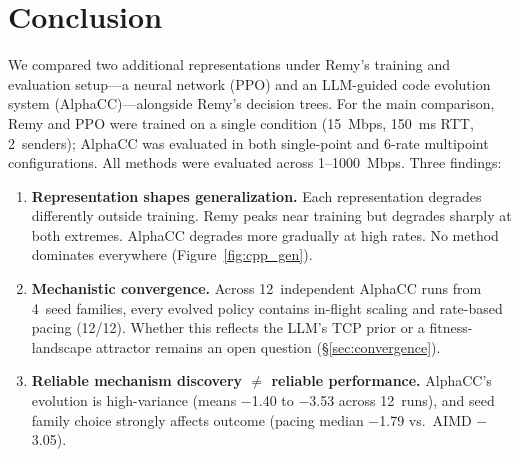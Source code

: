 \section{Conclusion}

We compared two additional representations under Remy's training and
evaluation setup---a neural network (PPO) and an LLM-guided code
evolution system (AlphaCC)---alongside Remy's decision trees. For the
main comparison, Remy and PPO were trained on a single condition
(15~Mbps, 150~ms RTT, 2~senders); AlphaCC was evaluated in both
single-point and 6-rate multipoint configurations. All methods
were evaluated across 1--1000~Mbps. Three findings:

\begin{enumerate}
\item \textbf{Representation shapes generalization.} Each
  representation degrades differently outside training. Remy peaks
  near training but degrades sharply at both extremes. AlphaCC
  degrades more gradually at high rates. No method dominates
  everywhere (Figure~\ref{fig:cpp_gen}).

\item \textbf{Mechanistic convergence.} Across 12~independent
  AlphaCC runs from 4~seed families, every evolved policy contains
  in-flight scaling and rate-based pacing (12/12).
  Whether this reflects the LLM's TCP prior or a fitness-landscape
  attractor remains an open question (\S\ref{sec:convergence}).

\item \textbf{Reliable mechanism discovery $\neq$ reliable
  performance.} AlphaCC's evolution is high-variance (means
  $-$1.40 to $-$3.53 across 12~runs), and seed family choice
  strongly affects outcome (pacing median $-$1.79 vs.\ AIMD
  $-$3.05).
\end{enumerate}
